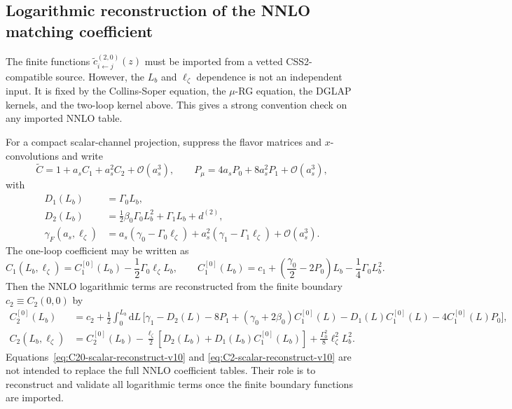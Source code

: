 \documentclass[11pt]{article}
\newcommand{\dd}{\mathrm{d}}
\newcommand{\order}[1]{\mathcal{O}\!\left(#1\right)}
\begin{document}
\subsection{Logarithmic reconstruction of the NNLO matching coefficient}
\label{subsec:nnlo-matching-reconstruction}

The finite functions $\widetilde c^{(2,0)}_{i\leftarrow j}(z)$ must be imported from a
vetted CSS2-compatible source.  However, the $L_b$ and $\ell_\zeta$ dependence is not an
independent input.  It is fixed by the Collins-Soper equation, the $\mu$-RG equation, the
DGLAP kernels, and the two-loop kernel above.  This gives a strong convention check on
any imported NNLO table.

For a compact scalar-channel projection, suppress the flavor matrices and $x$-convolutions
and write
\begin{equation}
  \widetilde C
  =1+a_s C_1+a_s^2 C_2+\order{a_s^3},
  \qquad
  P_\mu=4a_s P_0+8a_s^2 P_1+\order{a_s^3},
  \label{eq:scalar-C-expansion-v10}
\end{equation}
with
\begin{align}
  D_1(L_b)&=\Gamma_0 L_b,\\
  D_2(L_b)&=\frac{1}{2}\beta_0\Gamma_0L_b^2+\Gamma_1L_b+d^{(2)},\\
  \gamma_F(a_s,\ell_\zeta)
  &=a_s(\gamma_0-\Gamma_0\ell_\zeta)
   +a_s^2(\gamma_1-\Gamma_1\ell_\zeta)+\order{a_s^3}.
  \label{eq:scalar-D-gamma-v10}
\end{align}
The one-loop coefficient may be written as
\begin{equation}
  C_1(L_b,\ell_\zeta)
  =C_1^{[0]}(L_b)-\frac{1}{2}\Gamma_0\ell_\zeta L_b,
  \qquad
  C_1^{[0]}(L_b)
  =c_1+\left(\frac{\gamma_0}{2}-2P_0\right)L_b-\frac{1}{4}\Gamma_0L_b^2.
  \label{eq:C1-scalar-reconstruct-v10}
\end{equation}
Then the NNLO logarithmic terms are reconstructed from the finite boundary
$c_2\equiv C_2(0,0)$ by
\begin{align}
  C_2^{[0]}(L_b)
  &=c_2+\frac{1}{2}\int_0^{L_b}\!\dd L\,
  \Big[
    \gamma_1-D_2(L)-8P_1
    +(\gamma_0+2\beta_0)C_1^{[0]}(L)
    -D_1(L)C_1^{[0]}(L)
    -4C_1^{[0]}(L)P_0
  \Big],
  \label{eq:C20-scalar-reconstruct-v10}
  \\
  C_2(L_b,\ell_\zeta)
  &=C_2^{[0]}(L_b)
    -\frac{\ell_\zeta}{2}
      \left[D_2(L_b)+D_1(L_b)C_1^{[0]}(L_b)\right]
    +\frac{\Gamma_0^2}{8}\ell_\zeta^2 L_b^2.
  \label{eq:C2-scalar-reconstruct-v10}
\end{align}
Equations~\eqref{eq:C20-scalar-reconstruct-v10} and
\eqref{eq:C2-scalar-reconstruct-v10} are not intended to replace the full NNLO
coefficient tables.  Their role is to reconstruct and validate all logarithmic terms once
the finite boundary functions are imported.
\end{document}
